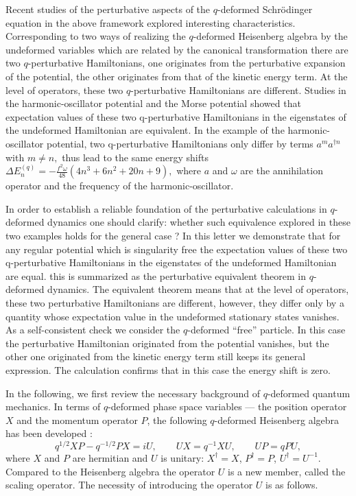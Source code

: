 \documentclass[a4paper,12pt]{article}
\begin{document}
   Recent studies of the perturbative aspects of the $q$-deformed 
Schr\"odinger equation in the above framework explored interesting 
characteristics.
Corresponding to two ways of realizing the $q$-deformed Heisenberg algebra 
by the undeformed variables which are related by the canonical transformation 
there are two $q$-perturbative Hamiltonians, 
one originates from the perturbative expansion of the  potential, 
the other  originates from that of the  kinetic energy term. 
At the level of operators, these two $q$-perturbative Hamiltonians are 
different. Studies in  the harmonic-oscillator potential 
and the Morse potential showed that \cite{ZO01} expectation values of these 
two q-perturbative Hamiltonians in the eigenstates of the undeformed 
 Hamiltonian are equivalent.
In the example of the harmonic-oscillator potential, two q-perturbative 
Hamiltonians only differ by terms $a^ma^{\dagger n}$ with $m\ne n,$
 thus lead to the same energy shifts 
$\Delta E^{(q)}_n
=-\frac{f^2\omega}{48}\left(4n^3+6n^2+20n+9\right),$
where $a$ and $\omega$ are the annihilation operator and the frequency of 
 the harmonic-oscillator.

In order to establish a reliable foundation of  the perturbative 
calculations in $q$-deformed dynamics  one should clarify: 
whether such equivalence explored in these two examples holds for the 
general case ?
In this letter we demonstrate that for any regular potential  which is 
singularity free the expectation values
 of these two q-perturbative Hamiltonians in the eigenstates of the 
undeformed  Hamiltonian are equal. this is summarized as the perturbative 
equivalent theorem in $q$-deformed dynamics. 
The equivalent theorem means that at the level of operators, 
these two perturbative Hamiltonians are different, however, they differ only 
by a quantity whose expectation value in the undeformed stationary states
 vanishes.
As a self-consistent  check we consider the  $q$-deformed ``free'' particle. 
In this case the  perturbative Hamiltonian  originated from the potential 
vanishes, 
but the other one originated from the kinetic energy term still keeps its 
general expression. 
The calculation confirms that in this case the energy shift is zero. 

   In the following, we first review the necessary background of $q$-deformed 
quantum mechanics.
In terms of $q$-deformed phase space variables --- 
the position operator $X$ and the momentum operator $P$, 
the following $q$-deformed Heisenberg algebra has been
developed \cite{Hebecker, Fichtmuller}:
\begin{equation}
\label{Eq:q-algebra}
q^{1/2}XP-q^{-1/2}PX=iU, \qquad    
UX=q^{-1}XU, \qquad
UP=qPU,
\end{equation}
where $X$ and $P$ are hermitian and $U$ is unitary:
$X^{\dagger}=X$, $P^{\dagger}=P$, $U^{\dagger}=U^{-1}$.
Compared to the Heisenberg algebra the operator $U$ is a new member, 
called the scaling operator. 
The necessity of introducing the operator $U$ is as follows. 
\end{document}
